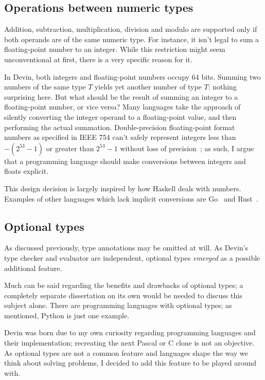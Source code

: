 \documentclass[UdineBachThesis,american,11pt]{PhdThesis}
\begin{document}
  \subsection{Operations between numeric types}

  Addition, subtraction, multiplication, division and modulo are supported only
  if both operands are of the same numeric type. For instance, it isn't legal to
  sum a floating-point number to an integer. While this restriction might seem
  unconventional at first, there is a very specific reason for it.

  In Devin, both integers and floating-point numbers occupy 64 bits. Summing two
  numbers of the same type $T$ yields yet another number of type $T$: nothing
  surprising here. But what should be the result of summing an integer to a
  floating-point number, or vice versa? Many languages take the approach of
  silently converting the integer operand to a floating-point value, and then
  performing the actual summation. Double-precision floating-point format
  numbers as specified in IEEE 754 can't safely represent integers less than
  $-\left(2^{53} - 1\right)$ or greater than $2^{53} - 1$ without loss of
  precision~\cite{mdn-is-safe-integer}; as such, I argue that a programming
  language should make conversions between integers and floats explicit.

  This design decision is largely inspired by how Haskell deals with numbers.
  Examples of other languages which lack implicit conversions are
  Go~\cite{go-numeric-types} and Rust~\cite{rust-conversion}.

  \subsection{Optional types}

  As discussed previously, type annotations may be omitted at will. As Devin's
  type checker and evaluator are independent, optional types \emph{emerged} as a
  possible additional feature.

  Much can be said regarding the benefits and drawbacks of optional types; a
  completely separate dissertation on its own would be needed to discuss this
  subject alone. There are programming languages with optional types; as
  mentioned, Python is just one example.

  Devin was born due to my own curiosity regarding programming languages and
  their implementation; recreating the next Pascal or C clone is not an
  objective. As optional types are not a common feature and languages shape the
  way we think about solving problems, I decided to add this feature to be
  played around with.
\end{document}
